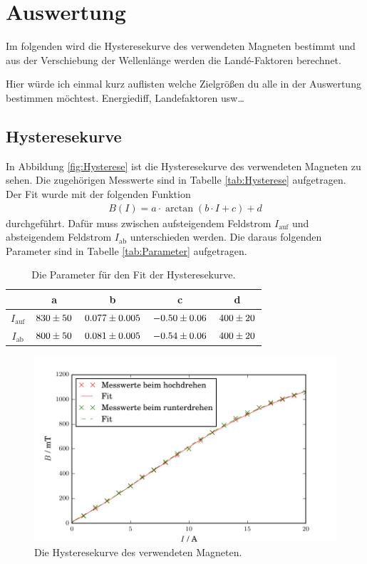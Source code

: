 \newpage
\section{Auswertung}
\label{sec:Auswertung}
Im folgenden wird die Hysteresekurve des verwendeten Magneten bestimmt und aus der Verschiebung der Wellenlänge werden die Landé-Faktoren berechnet.

{Hier würde ich einmal kurz auflisten welche Zielgrößen du alle in der Auswertung bestimmen möchtest. Energiediff, Landefaktoren usw\ldots}


\subsection{Hysteresekurve}
In Abbildung \eqref{fig:Hysterese} ist die Hysteresekurve des verwendeten Magneten zu sehen. Die zugehörigen Messwerte sind in Tabelle \eqref{tab:Hysterese} aufgetragen. Der Fit wurde mit der folgenden Funktion
\begin{align*}
  B(I) = a\cdot \arctan(b\cdot I + c) + d
\end{align*}
durchgeführt. Dafür muss zwischen aufsteigendem Feldstrom $I_\text{auf}$ und absteigendem Feldstrom $I_\text{ab}$ unterschieden werden. Die daraus folgenden Parameter sind in Tabelle \eqref{tab:Parameter} aufgetragen.

\begin{table}[H] %
  \centering
  \caption{Die Parameter für den Fit der Hysteresekurve.}
  \label{tab:Parameter}
  \begin{tabular}{c|c|c|c|c}
    & a & b & c & d \\
    \hline
    $I_\text{auf}$ & $\num{830 +- 50}$ & $\num{0.077 +- 0.005}$ & $\num{-0.50 +- 0.06}$ & $\num{400 +- 20}$ \\
    $I_\text{ab}$ & $\num{800 +- 50}$ & $\num{0.081 +- 0.005}$ & $\num{-0.54 +- 0.06}$ & $\num{400 +- 20}$ \\
  \end{tabular}
\end{table}

\begin{figure}[H] %
  \centering
  \includegraphics[width=\linewidth]{Bilder/Hysterese.pdf}
  \caption{Die Hysteresekurve des verwendeten Magneten.}
  \label{fig:Hysterese}
\end{figure}

